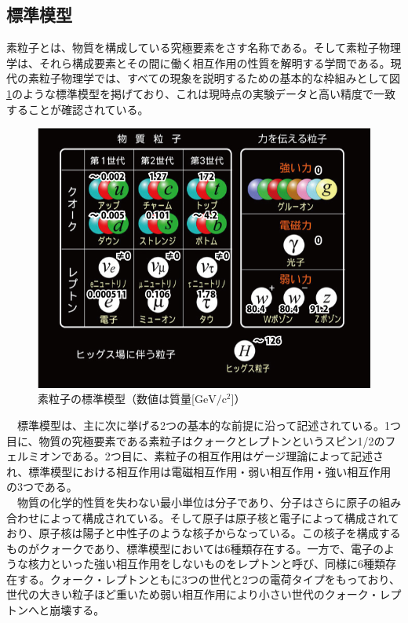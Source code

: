 \subsection{標準模型}
素粒子とは、物質を構成している究極要素をさす名称である。そして素粒子物理学は、それら構成要素とその間に働く相互作用の性質を解明する学問である。現代の素粒子物理学では、すべての現象を説明するための基本的な枠組みとして図\ref{sm}のような標準模型を掲げており、これは現時点の実験データと高い精度で一致することが確認されている。\\
\begin{figure}[ht]
	\begin{center}
 \includegraphics[keepaspectratio, scale=0.4]
 	{Figure/Introduction/sm.jpg}
 		\caption{素粒子の標準模型（数値は質量[$\mathrm{GeV/c^2}$]）}
 		\label{sm}
	\end{center}
\end{figure}
　標準模型は、主に次に挙げる2つの基本的な前提に沿って記述されている。1つ目に、物質の究極要素である素粒子はクォークとレプトンというスピン1/2のフェルミオンである。2つ目に、素粒子の相互作用はゲージ理論によって記述され、標準模型における相互作用は電磁相互作用・弱い相互作用・強い相互作用の3つである。\\
　物質の化学的性質を失わない最小単位は分子であり、分子はさらに原子の組み合わせによって構成されている。そして原子は原子核と電子によって構成されており、原子核は陽子と中性子のような核子からなっている。この核子を構成するものがクォークであり、標準模型においては6種類存在する。一方で、電子のような核力といった強い相互作用をしないものをレプトンと呼び、同様に6種類存在する。クォーク・レプトンともに3つの世代と2つの電荷タイプをもっており、世代の大きい粒子ほど重いため弱い相互作用により小さい世代のクォーク・レプトンへと崩壊する。\\
